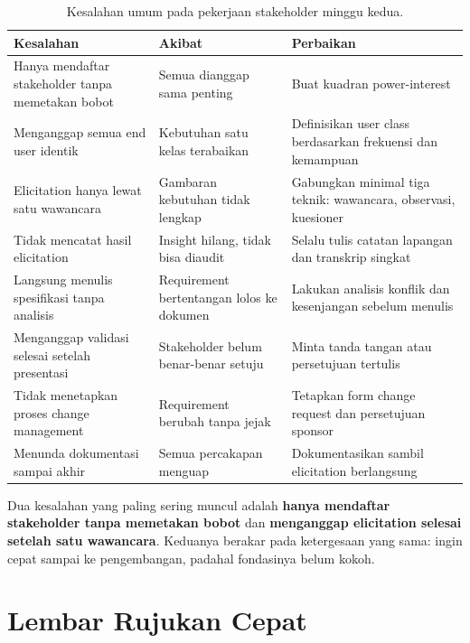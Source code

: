\documentclass[11pt,a4paper]{article}
\begin{document}
\begin{table}[H]
	\centering
	\caption{Kesalahan umum pada pekerjaan stakeholder minggu kedua.}
	\label{tab:mistakes}
	\footnotesize
	\begin{tabularx}{\textwidth}{l X X}
		\toprule
		Kesalahan                                         & Akibat                                    & Perbaikan                                                      \\
		\midrule
		Hanya mendaftar stakeholder tanpa memetakan bobot & Semua dianggap sama penting               & Buat kuadran power-interest                                    \\
		Menganggap semua end user identik                 & Kebutuhan satu kelas terabaikan           & Definisikan user class berdasarkan frekuensi dan kemampuan     \\
		Elicitation hanya lewat satu wawancara            & Gambaran kebutuhan tidak lengkap          & Gabungkan minimal tiga teknik: wawancara, observasi, kuesioner \\
		Tidak mencatat hasil elicitation                  & Insight hilang, tidak bisa diaudit        & Selalu tulis catatan lapangan dan transkrip singkat            \\
		Langsung menulis spesifikasi tanpa analisis       & Requirement bertentangan lolos ke dokumen & Lakukan analisis konflik dan kesenjangan sebelum menulis       \\
		Menganggap validasi selesai setelah presentasi    & Stakeholder belum benar-benar setuju      & Minta tanda tangan atau persetujuan tertulis                   \\
		Tidak menetapkan proses change management         & Requirement berubah tanpa jejak           & Tetapkan form change request dan persetujuan sponsor           \\
		Menunda dokumentasi sampai akhir                  & Semua percakapan menguap                  & Dokumentasikan sambil elicitation berlangsung                  \\
		\bottomrule
	\end{tabularx}
\end{table}

Dua kesalahan yang paling sering muncul adalah \textbf{hanya mendaftar stakeholder tanpa memetakan bobot} dan \textbf{menganggap elicitation selesai setelah satu wawancara}. Keduanya berakar pada ketergesaan yang sama: ingin cepat sampai ke pengembangan, padahal fondasinya belum kokoh.

\section{Lembar Rujukan Cepat}
\end{document}
